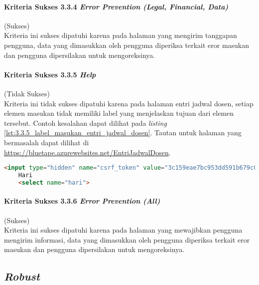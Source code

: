 \paragraph{Kriteria Sukses 3.3.4 \textit{Error Prevention (Legal, Financial, Data)\\}}
\label{par:kepatuhan_bluetape_kriteria_sukses_3.3.4}
(Sukses)\\

Kriteria ini sukses dipatuhi karena pada halaman yang mengirim tanggapan pengguna, data yang dimasukkan oleh pengguna diperiksa terkait eror masukan dan pengguna dipersilakan untuk mengoreksinya.

\paragraph{Kriteria Sukses 3.3.5 \textit{Help}}
\label{par:kepatuhan_bluetape_kriteria_sukses_3.3.5}
(Tidak Sukses)\\

Kriteria ini tidak sukses dipatuhi karena pada halaman entri jadwal dosen, setiap elemen masukan tidak memiliki label yang menjelaskan tujuan dari elemen tersebut. Contoh kesalahan dapat dilihat pada \textit{listing} \ref{lst:3.3.5_label_masukan_entri_jadwal_dosen}. Tautan untuk halaman yang bermasalah dapat dilihat di \url{https://bluetape.azurewebsites.net/EntriJadwalDosen}.

\begin{lstlisting}[frame=single, label={lst:3.3.5_label_masukan_entri_jadwal_dosen}, language=HTML, caption=Kriteria Sukses 3.3.5 - Tidak Terdapat Label pada Kolom Masukan di Halaman Entri Jadwal Dosen]
    <input type="hidden" name="csrf_token" value="3c159eae7bc953dd591b679c080ed066"/>
    Hari
    <select name="hari">
\end{lstlisting}

\paragraph{Kriteria Sukses 3.3.6 \textit{Error Prevention (All)}}
\label{par:kepatuhan_bluetape_kriteria_sukses_3.3.6}
(Sukses)\\

Kriteria ini sukses dipatuhi karena pada halaman yang mewajibkan pengguna mengirim informasi, data yang dimasukkan oleh pengguna diperiksa terkait eror masukan dan pengguna dipersilakan untuk mengoreksinya.

\subsection{\textit{Robust}}
\label{subsec:kepatuhan_bluetape_robust}

